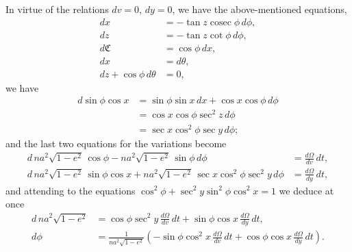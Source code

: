 \documentclass[11pt]{article}
\providecommand{\cosec}{\mathop{\mathrm{cosec}}}
\begin{document}
In virtue of the relations $dv = 0$, $dy = 0$, we have the above-mentioned equations,
\begin{align*}
dx &= -\tan z \cosec\phi\,d\phi,\\
dz &= -\tan z \cot\phi\,d\phi,\\
d\mathfrak{C} &= \cos\phi\,dx,\\
dx &= d\theta,\\
dz + \cos\phi\,d\theta &= 0,
\end{align*}
we have
\begin{align*}
d\sin\phi\cos x &= \sin\phi\sin x\,dx + \cos x\cos\phi\,d\phi\\
&= \cos x\cos\phi\sec^2 z\,d\phi\\
&= \sec x\cos^2\phi\sec y\,d\phi;
\end{align*}
and the last two equations for the variations become
\begin{align*}
d\,na^2\sqrt{1-e^2}\,\cos\phi - na^2\sqrt{1-e^2}\,\sin\phi\,d\phi &= \frac{d\Omega}{dv}\,dt,\\
d\,na^2\sqrt{1-e^2}\,\sin\phi\cos x + na^2\sqrt{1-e^2}\,\sec x\cos^2\phi\sec^2 y\,d\phi &= \frac{d\Omega}{dy}\,dt,
\end{align*}
and attending to the equations $\cos^2\phi + \sec^2 y \sin^2\phi \cos^2 x = 1$ we deduce at once
\begin{align*}
d\,na^2\sqrt{1-e^2} &= \cos\phi\sec^2 y\,\frac{d\Omega}{dv}\,dt + \sin\phi\cos x\,\frac{d\Omega}{dy}\,dt,\\
d\phi &= \frac{1}{na^2\sqrt{1-e^2}}\left(-\sin\phi\cos^2 x\,\frac{d\Omega}{dv}\,dt + \cos\phi\cos x\,\frac{d\Omega}{dy}\,dt\right).
\end{align*}
\end{document}
